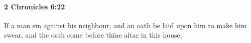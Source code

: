 
		\paragraph{2 Chronicles 6:22} %
			\label{2CHRONICLES-6-22}

			If a man sin against his neighbour, and an oath be laid upon him to make him swear, and the oath come before thine altar in this house;


